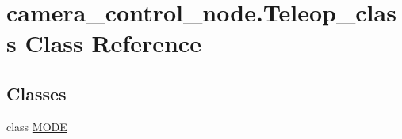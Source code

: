 \hypertarget{classcamera__control__node_1_1Teleop__class}{\section{camera\-\_\-control\-\_\-node.\-Teleop\-\_\-class Class Reference}
\label{classcamera__control__node_1_1Teleop__class}
}
\subsection*{Classes}
\begin{DoxyCompactItemize}
\item 
class \hyperlink{classcamera__control__node_1_1Teleop__class_1_1MODE}{M\-O\-D\-E}
\end{DoxyCompactItemize}
